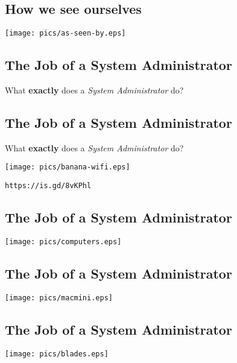 \documentclass[xga]{xdvislides}
\begin{document}
\subsection{How we see ourselves}
\vspace*{\fill}
\begin{center}
	\texttt{[image: pics/as-seen-by.eps]} \\
\end{center}
\vspace*{\fill}

\subsection{The Job of a System Administrator}
What {\bf exactly} does a {\em System Administrator} do?

\subsection{The Job of a System Administrator}
What {\bf exactly} does a {\em System Administrator} do?
\vspace*{\fill}
\begin{center}
	\texttt{[image: pics/banana-wifi.eps]} \\
\end{center}
\vspace*{\fill}
{\tt https://is.gd/8vKPhl}

\subsection{The Job of a System Administrator}
\begin{center}
	\texttt{[image: pics/computers.eps]} \\
\end{center}

\subsection{The Job of a System Administrator}
\vspace*{\fill}
\begin{center}
	\texttt{[image: pics/macmini.eps]} \\
\end{center}
\vspace*{\fill}

\subsection{The Job of a System Administrator}
\vspace*{\fill}
\begin{center}
	\texttt{[image: pics/blades.eps]} \\
\end{center}
\vspace*{\fill}
\end{document}
